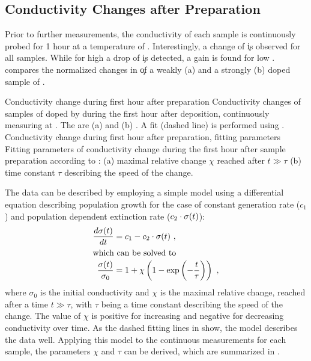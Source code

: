 \subsection{Conductivity Changes after Preparation}%
\label{sec:ResPdLongTimeCond}
Prior to further measurements, the conductivity of each sample is continuously probed \insitu for 1 hour at a temperature of \T[25]. Interestingly, a change of \c is observed for all samples. While for high \C a drop of \c is detected, a gain is found for low \C.  compares the normalized changes in \c of a weakly (a) and a strongly (b) doped sample of \CrPd.

{Conductivity change during first hour after preparation}
{Conductivity changes of samples of \CS doped by \CrPd during the first hour after deposition, continuously measuring \insitu at \T[25]. The \CLongs are (a) \C[0.012] and (b) \C[0.345]. A fit (dashed line) is performed using .
}
%
{Conductivity change during first hour after preparation, fitting parameters}
{Fitting parameters of conductivity change during the first hour after sample preparation according to : (a) maximal relative change $\chi$ reached after $t\gg\tau$ (b) time constant $\tau$ describing the speed of the change.
}
%

The data can be described by employing a simple model using a differential equation describing population growth for the case of constant generation rate ($c_1$) and population dependent extinction rate ($c_2 \cdot \c(t)$):
\begin{align}
\frac{d\c(t)}{dt} &= c_1 - c_2 \cdot \c(t)
\KOMMA
\\
%
\intertext{which can be solved to}
\frac{\c(t)}{\sigma_0}
&= 1 + \chi \left( 1 - \exp{-\frac{t}{\tau}} \right)
\label{eq:LongTimeCond-exp}
\KOMMA
\end{align}
where $\sigma_0$ is the initial conductivity and $\chi$ is the maximal relative change, reached after a time $t\gg\tau$, with $\tau$ being a time constant describing the speed of the change. The value of $\chi$ is positive for increasing and negative for decreasing conductivity over time. As the dashed fitting lines in  show, the model describes the data well.
Applying this model to the continuous measurements for each sample, the parameters $\chi$ and $\tau$ can be derived, which are summarized in .


